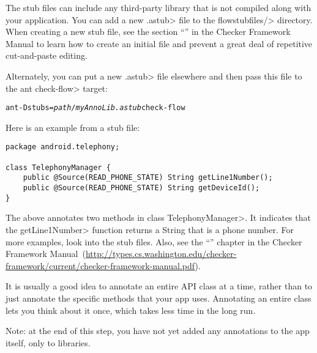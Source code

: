 The stub files can include any third-party library that is not compiled
along with your application.  You can add a new \<.astub> file to the
\<flowstubfiles/> directory. When creating a new stub file, see the section
``'' in the Checker Framework Manual to learn how to create an
initial file and prevent a great deal of repetitive cut-and-paste editing.

Alternately, you can put a new \<.astub> file elsewhere and then pass this
file to the \<ant check-flow> target:

\begin{alltt}
ant -Dstubs=\emph{path/myAnnoLib.astub} check-flow
\end{alltt}

Here is an example from a stub file:

\begin{Verbatim}
package android.telephony;

class TelephonyManager {
    public @Source(READ_PHONE_STATE) String getLine1Number();
    public @Source(READ_PHONE_STATE) String getDeviceId();
}
\end{Verbatim}

\noindent
The above annotates two methods in class \<TelephonyManager>.
It indicates that the \<getLine1Number> function returns a String that is a
phone number.  For more examples, look into the stub files. Also, see 
the
``'' chapter in the Checker Framework Manual\ifhevea\else\ (\url{http://types.cs.washington.edu/checker-framework/current/checker-framework-manual.pdf})\fi.




It is usually a good idea to annotate an entire API class at a time, rather
than to just annotate the specific methods that your app uses.  Annotating
an entire class lets you think about it once, which takes less time in the
long run. 


Note: at the end of this step, you have not yet added any annotations to
the app itself, only to libraries.

